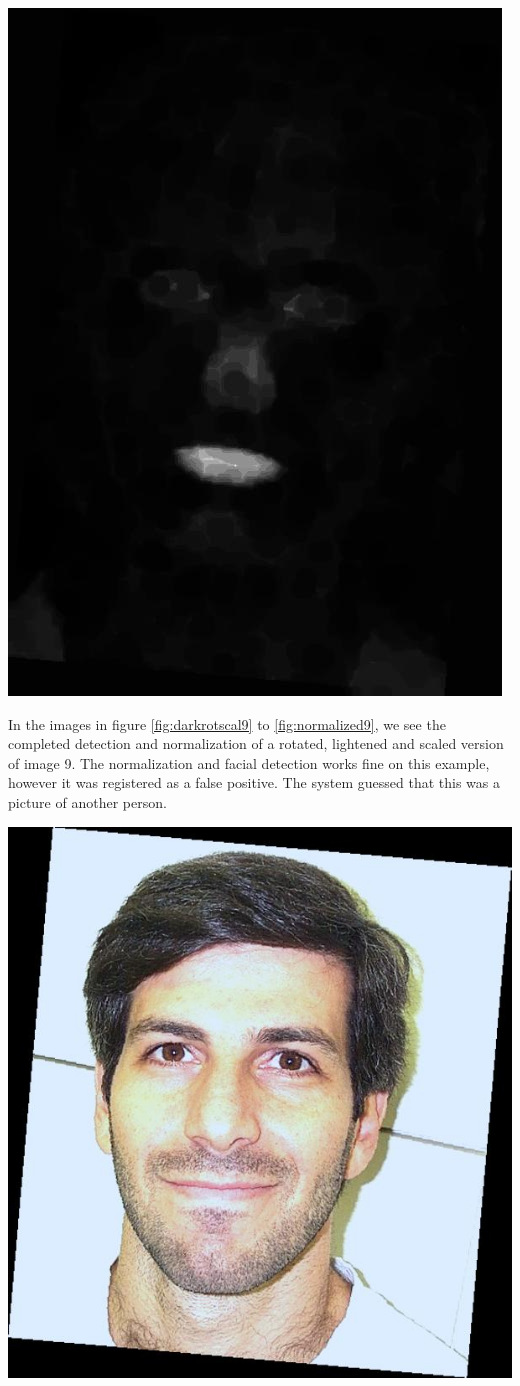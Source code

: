 \begin{Figure}
  \centering
    \includegraphics[width=0.5\columnwidth]{images/im7_mouth.jpg}
\end{Figure}


In the images in figure \ref{fig:darkrotscal9} to \ref{fig:normalized9}, we see the completed detection and normalization of a rotated, lightened and scaled version of image 9. The normalization and facial detection works fine on this example, however it was registered as a false positive. The system guessed that this was a picture of another person.


\begin{Figure}
  \centering
    \includegraphics[width=0.5\columnwidth]{images/im9_img.jpg}
\end{Figure}

